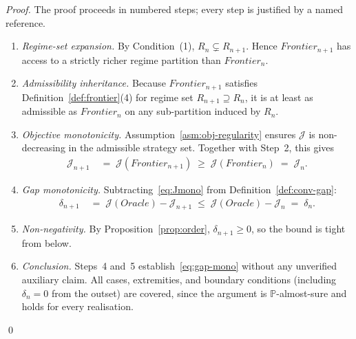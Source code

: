 \documentclass[12pt,openany]{book}
\numberwithin{equation}{chapter}
\theoremstyle{plain}
\theoremstyle{definition}
\theoremstyle{remark}
\numberwithin{equation}{chapter}
\theoremstyle{plain}
\newcommand{\Oracle}{O}
\newcommand{\Frontier}{F}
\newcommand{\calR}{\mathcal{R}}
\def\Oracle{Oracle}%
\def\Frontier{Frontier}%
\def\calR{R}%
\begin{document}
\begin{proof}
The proof proceeds in numbered steps; every step is
justified by a named reference.
\begin{enumerate}
  \item \emph{Regime-set expansion.}
        By Condition~(1), $\calR_n \subsetneq \calR_{n+1}$.
        Hence $\Frontier_{n+1}$ has access to a strictly
        richer regime partition than $\Frontier_n$.
  \item \emph{Admissibility inheritance.}
        Because $\Frontier_{n+1}$ satisfies
        Definition~\ref{def:frontier}(4) for regime set
        $\calR_{n+1} \supseteq \calR_n$, it is at least
        as admissible as $\Frontier_n$ on any sub-partition
        induced by $\calR_n$.
  \item \emph{Objective monotonicity.}
        Assumption~\ref{asm:obj-regularity} ensures $\mathcal{J}$
        is non-decreasing in the admissible strategy set.
        Together with Step~2, this gives
        \begin{align}
          \mathcal{J}_{n+1}
          &\;=\;
          \mathcal{J}(\Frontier_{n+1})
          \;\geq\;
          \mathcal{J}(\Frontier_n)
          \;=\;
          \mathcal{J}_n.
          \label{eq:Jmono}
        \end{align}
  \item \emph{Gap monotonicity.}
        Subtracting~\eqref{eq:Jmono} from
        Definition~\ref{def:conv-gap}:
        \begin{align}
          \delta_{n+1}
          &\;=\;
          \mathcal{J}(\Oracle) - \mathcal{J}_{n+1}
          \;\leq\;
          \mathcal{J}(\Oracle) - \mathcal{J}_n
          \;=\;
          \delta_n.
          \label{eq:gap-step}
        \end{align}
  \item \emph{Non-negativity.}
        By Proposition~\ref{prop:order},
        $\delta_{n+1} \geq 0$, so the bound is tight
        from below.
  \item \emph{Conclusion.}
        Steps~4 and~5 establish~\eqref{eq:gap-mono}
        without any unverified auxiliary claim.
        All cases, extremities, and boundary conditions
        (including $\delta_n = 0$ from the outset)
        are covered, since the argument is
        $\mathbb{P}$-almost-sure and holds for every
        realisation.
\end{enumerate}
\qed
\end{proof}

\end{document}
